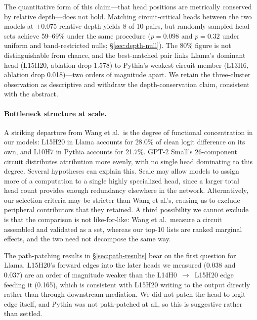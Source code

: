 \documentclass[11pt,a4paper]{article}
\begin{document}
The quantitative form of this claim---that head positions are metrically conserved by
relative depth---does not hold. Matching circuit-critical heads between the two models
at $\pm$0.075 relative depth yields 8 of 10 pairs, but randomly sampled head sets
achieve 59--69\% under the same procedure ($p = 0.098$ and $p = 0.32$ under uniform
and band-restricted nulls; \S\ref{sec:depth-null}). The 80\% figure is not
distinguishable from chance, and the best-matched pair links Llama's dominant head
(L15H20, ablation drop 1.578) to Pythia's weakest circuit member (L13H6, ablation
drop 0.018)---two orders of magnitude apart. We retain the three-cluster observation
as descriptive and withdraw the depth-conservation claim, consistent with the abstract.

\paragraph{Bottleneck structure at scale.}
A striking departure from Wang et al.\ is the degree of functional concentration in
our models: L15H20 in Llama accounts for 28.0\% of clean logit difference on its own,
and L10H7 in Pythia accounts for 21.7\%. GPT-2 Small's 26-component circuit
distributes attribution more evenly, with no single head dominating to this degree.
Several hypotheses can explain this. Scale may allow models to assign more of a
computation to a single highly specialized head, since a larger total head count
provides enough redundancy elsewhere in the network. Alternatively, our selection
criteria may be stricter than Wang et al.'s, causing us to exclude peripheral
contributors that they retained. A third possibility we cannot exclude is that the
comparison is not like-for-like: Wang et al.\ measure a circuit assembled and
validated as a set, whereas our top-10 lists are ranked marginal effects, and the two
need not decompose the same way.

The path-patching results in \S\ref{sec:path-results} bear on the first question for
Llama. L15H20's forward edges into the later heads we measured (0.038 and 0.037) are
an order of magnitude weaker than the L14H0~$\to$~L15H20 edge feeding it (0.165),
which is consistent with L15H20 writing to the output directly rather than through
downstream mediation. We did not patch the head-to-logit edge itself, and Pythia was
not path-patched at all, so this is suggestive rather than settled.
\end{document}
